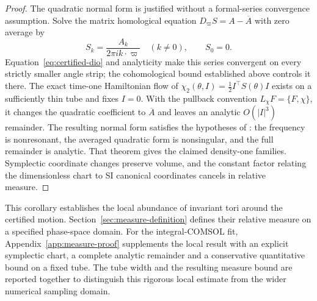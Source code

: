 \begin{proof}
The quadratic normal form is justified without a formal-series
convergence assumption. Solve the matrix homological equation
$D_\varpi S=A-\overline A$ with zero average by
\[
 S_k=\frac{A_k}{2\pi i k\cdot\varpi}\quad(k\ne0),\qquad S_0=0.
\]
Equation~\eqref{eq:certified-dio} and analyticity make this series
convergent on every strictly smaller angle strip; the cohomological
bound established above controls it there.
The exact time-one Hamiltonian flow of
$\chi_2(\theta,I)=\tfrac12 I^\top S(\theta)I$ exists on a sufficiently
thin tube and fixes $I=0$. With the pullback convention
$L_{\chi}F=\{F,\chi\}$, it changes the quadratic coefficient to
$\overline A$ and leaves an analytic $O(|I|^3)$ remainder.
The resulting normal form satisfies the hypotheses of
\citet[Theorem~6, analytic case]{bounemoura2016torus}:
the frequency is nonresonant, the averaged quadratic form is
nonsingular, and the full remainder is analytic. That theorem gives
the claimed density-one families. Symplectic coordinate changes
preserve volume, and the constant factor relating the dimensionless
chart to SI canonical coordinates cancels in relative measure.
\end{proof}

This corollary establishes the local abundance of invariant tori around
the certified motion. Section~\ref{sec:measure-definition} defines their
relative measure on a specified phase-space domain. For the
integral-COMSOL fit, Appendix~\ref{app:measure-proof} supplements the local
result with an explicit symplectic chart, a complete analytic remainder
and a conservative quantitative bound on a fixed tube. The tube width
and the resulting measure bound are reported together to distinguish
this rigorous local estimate from the wider numerical sampling domain.
